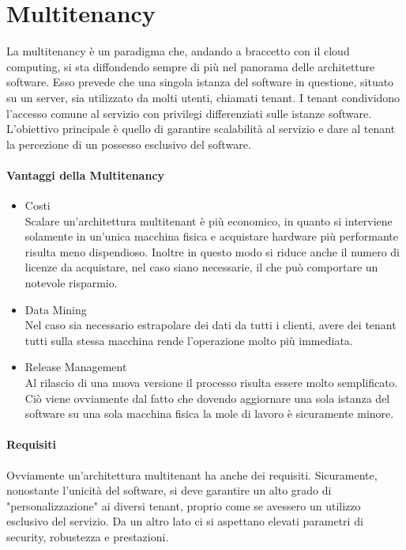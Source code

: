 \section{Multitenancy}
La multitenancy è un paradigma che, andando a braccetto con il cloud computing, si sta diffondendo sempre di più nel panorama delle architetture software. Esso prevede che una singola istanza del software in questione, situato su un server, sia utilizzato da molti utenti, chiamati tenant. I tenant condividono l'accesso comune al servizio con privilegi differenziati sulle istanze software. L'obiettivo principale è quello di garantire scalabilità al servizio e dare al tenant la percezione di un possesso esclusivo del software.

\paragraph{Vantaggi della Multitenancy}
\begin{itemize}
	\item Costi \\
	Scalare un'architettura multitenant è più economico, in quanto si interviene solamente in un'unica macchina fisica e acquistare hardware più performante risulta meno dispendioso. Inoltre in questo modo si riduce anche il numero di licenze da acquistare, nel caso siano necessarie, il che può comportare un notevole risparmio.
	\item Data Mining \\
	Nel caso sia necessario estrapolare dei dati da tutti i clienti, avere dei tenant tutti sulla stessa macchina rende l'operazione molto più immediata.
	\item  Release Management \\
	Al rilascio di una nuova versione il processo risulta essere molto semplificato. Ciò viene ovviamente dal fatto che dovendo aggiornare una sola istanza del software su una sola macchina fisica la mole di lavoro è sicuramente minore.
\end{itemize}

\paragraph{Requisiti}
Ovviamente un'architettura multitenant ha anche dei requisiti. Sicuramente, nonostante l'unicità del software, si deve garantire un alto grado di "personalizzazione" ai diversi tenant, proprio come se avessero un utilizzo esclusivo del servizio. Da un altro lato ci si aspettano elevati parametri di security, robustezza e prestazioni.

